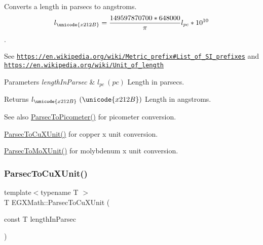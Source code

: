 Converts a length in parsecs to angstroms. \[ l_{\unicode{x212B}}=\frac{149597870700 * 648000}{\pi}l_{pc} * 10^{10} \]. 

See \href{https://en.wikipedia.org/wiki/Metric_prefix#List_of_SI_prefixes}{\tt https\+://en.\+wikipedia.\+org/wiki/\+Metric\+\_\+prefix\#\+List\+\_\+of\+\_\+\+S\+I\+\_\+prefixes} and \href{https://en.wikipedia.org/wiki/Unit_of_length}{\tt https\+://en.\+wikipedia.\+org/wiki/\+Unit\+\_\+of\+\_\+length} 
\begin{DoxyParams}{Parameters}
{\em length\+In\+Parsec} & $ l_{pc}\ (pc)$ Length in parsecs. \\
\hline
\end{DoxyParams}
\begin{DoxyReturn}{Returns}
$ l_{\unicode{x212B}}\ (\unicode{x212B})$ Length in angstroms. 
\end{DoxyReturn}
\begin{DoxySeeAlso}{See also}
\mbox{\hyperlink{group___e_g_x_math-_conversions-_length_conversions-_astronomical-_parsec-_s_i_ga2d56b414320940d42a8956239e54c8b0}{Parsec\+To\+Picometer()}} for picometer conversion. 

\mbox{\hyperlink{group___e_g_x_math-_conversions-_length_conversions-_astronomical-_parsec-_non-_s_i_gad21a910de08e37197d58edf64c377222}{Parsec\+To\+Cu\+X\+Unit()}} for copper x unit conversion. 

\mbox{\hyperlink{group___e_g_x_math-_conversions-_length_conversions-_astronomical-_parsec-_non-_s_i_gaf076c4eb125bbc9fbabc040300961b6d}{Parsec\+To\+Mo\+X\+Unit()}} for molybdenum x unit conversion. 
\end{DoxySeeAlso}
\mbox{\label{group___e_g_x_math-_conversions-_length_conversions-_astronomical-_parsec-_non-_s_i_gad21a910de08e37197d58edf64c377222}} 
\subsubsection{\texorpdfstring{Parsec\+To\+Cu\+X\+Unit()}{ParsecToCuXUnit()}}
{\footnotesize\ttfamily template$<$typename T $>$ \\
T E\+G\+X\+Math\+::\+Parsec\+To\+Cu\+X\+Unit (\begin{DoxyParamCaption}\item[{const T}]{length\+In\+Parsec }\end{DoxyParamCaption})}



